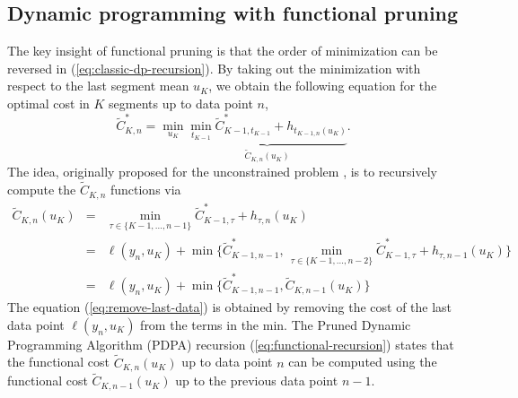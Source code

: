 \documentclass[twoside,11pt]{article}
\begin{document}
\subsection{Dynamic programming with functional pruning}
\label{sec:functional-pruning}

The key insight of
functional pruning is that the order of minimization can be reversed in
(\ref{eq:classic-dp-recursion}). By taking out the minimization with
respect to the last segment mean $u_K$, we obtain the following equation for the optimal cost in $K$ segments up to data point $n$,
\begin{equation}
  \tilde{C}^*_{K,n} = \min_{u_K} \underbrace{\min_{t_{K-1}} 
\tilde{C}^*_{K-1,t_{K-1}}
+  h_{t_{K-1,n}(u_K)}}_{\tilde{C}_{K,n}(u_K)}.
\end{equation}
The idea, originally proposed for the unconstrained problem
\citep{pruned-dp}, is to recursively compute the $\tilde{C}_{K,n}$
functions via
\begin{eqnarray}
\tilde{C}_{K,n}(u_K) 
&=& \min_{\tau\in\{K-1,\dots,n-1\}} \tilde{C}^*_{K-1,\tau} + h_{\tau,n}(u_K)
\\
&=& \ell(y_n, u_K) + \min\{\tilde{C}^*_{K-1,n-1},\, 
\min_{\tau\in\{K-1,\dots,n-2\}} \tilde{C}^*_{K-1,\tau} + h_{\tau,n-1}(u_K)
\}\label{eq:remove-last-data}\\
&=& \ell(y_n, u_K) + \min\{\tilde{C}^*_{K-1,n-1}, \tilde{C}_{K,n-1}(u_K)\}
\label{eq:functional-recursion}
\end{eqnarray}
The equation (\ref{eq:remove-last-data}) is obtained by removing the
cost of the last data point $\ell(y_n, u_K)$ from the terms in the
min. The Pruned Dynamic Programming Algorithm (PDPA) recursion
(\ref{eq:functional-recursion}) states that the functional cost
$\tilde{C}_{K,n}(u_K)$ up to data point $n$ can be computed using the
functional cost $\tilde{C}_{K,n-1}(u_K)$ up to the previous data point
$n-1$.
\end{document}
